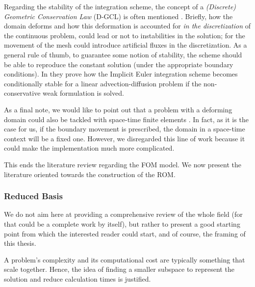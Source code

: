 Regarding the stability of the integration scheme,
the concept of a 
\textit{(Discrete) Geometric Conservation Law} (D-GCL) 
is often mentioned
\cite{HUGHES2000467,
GUILLARD20001467,
FARHAT2001669,
LESOINNE199671}.
Briefly, how the domain deforms and how this deformation is accounted for
\textit{in the discretization} of the continuous problem,
could lead or not to instabilities in the solution; 
for the movement of the mesh could introduce artificial fluxes in the discretization.
As a general rule of thumb, 
to guarantee some notion of stability,
the scheme should be able to reproduce the constant solution 
(under the appropriate boundary conditions).
In \cite{formaggiaALE} they prove how the Implicit Euler integration scheme
becomes conditionally stable for a linear advection-diffusion problem
if the non-conservative weak formulation is solved.

As a final note, 
we would like to point out that a problem with a deforming domain
could also be tackled with \mbox{space-time} finite elements 
\cite{TEZDUYAR1992339}.
In fact, as it is the case for us, 
if the boundary movement is prescribed,
the domain in a \mbox{space-time} context will be a fixed one.
However, 
we disregarded this line of work because it could make the implementation much more complicated.

This ends the literature review regarding the FOM model.
We now present the literature oriented towards the construction of the ROM.

\subsubsection{Reduced Basis}
We do not aim here at providing a comprehensive review of the whole field
(for that could be a complete work by itself),
but rather to present a good starting point 
from which the interested reader could start, 
and of course, the framing of this thesis.

A problem's complexity and its computational cost
are typically something that scale together.
Hence, the idea of finding a smaller subspace to represent
the solution and reduce calculation times is justified.

